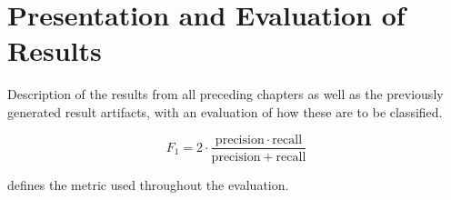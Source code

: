 \chapter{Presentation and Evaluation of Results}
\label{ch:results}

Description of the results from all preceding chapters as well as the
previously generated result artifacts, with an evaluation of how these are to
be classified.

\begin{equation}
\label{eq:example}
F_1 = 2 \cdot \frac{\mathrm{precision} \cdot \mathrm{recall}}
                   {\mathrm{precision} + \mathrm{recall}}
\end{equation}

 defines the metric used throughout the evaluation.
